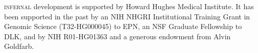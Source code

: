\textsc{infernal} development is supported by Howard Hughes Medical
Institute. It has been supported in the past by an NIH NHGRI
Institutional Training Grant in Genomic Science (T32-HG000045) to EPN,
an NSF Graduate Fellowship to DLK, and by NIH R01-HG01363 and a
generous endowment from Alvin Goldfarb. 
